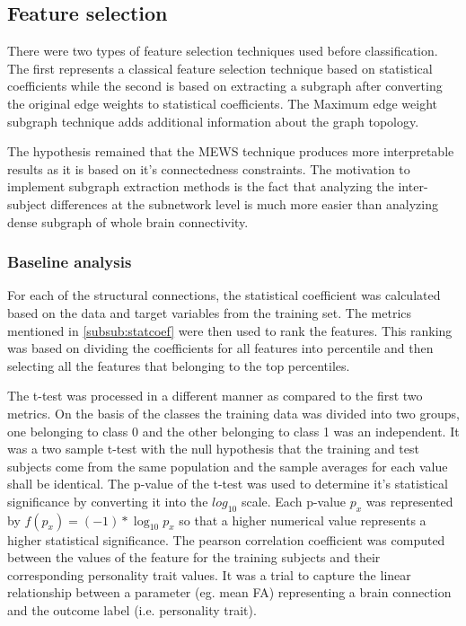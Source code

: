 \documentclass[msthesis.tex]{subfiles}
\begin{document}
\subsection{Feature selection} 
There were two types of feature selection techniques used before classification. The first represents a classical feature selection technique based on statistical coefficients while the second is based on extracting a subgraph after converting the original edge weights to statistical coefficients. The Maximum edge weight subgraph technique adds additional information about the graph topology. 

The hypothesis remained that the MEWS technique produces more interpretable results as it is based on it's connectedness constraints. The motivation to implement subgraph extraction methods is the fact that analyzing the inter-subject differences at the subnetwork level is much more easier than analyzing dense subgraph of whole brain connectivity. 

\subsubsection{Baseline analysis}
For each of the structural connections, the statistical coefficient was calculated based on the data and target variables from the training set. The metrics mentioned in \ref{subsub:statcoef} were then used to rank the features. This ranking was based on dividing the coefficients for all features into percentile and then selecting all the features that belonging to the top percentiles.

The t-test was processed in a different manner as compared to the first two metrics. On the basis of the classes the training data was divided into two groups, one belonging to class 0 and the other belonging to class 1  was an independent. It was a two sample t-test with the null hypothesis that the training and test subjects come from the same population and the sample averages for each value shall be identical. The p-value of the t-test was used to determine it's statistical significance by converting it into the $log_10$ scale. Each p-value $p_x$ was represented by $ f(p_{x}) = (-1)*\log_{10} p_x$ so that a higher numerical value represents a higher statistical significance.
\iffalse
The pearson correlation coefficient was computed between the values of the feature for the training subjects and their corresponding personality trait values. It was a trial to capture the linear relationship between a parameter (eg. mean FA) representing a brain connection and the outcome label (i.e. personality trait).
\end{document}
